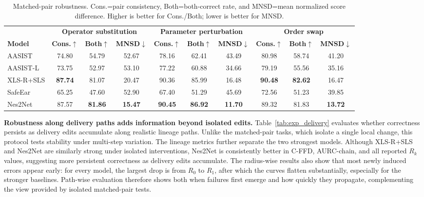 \begin{table}[t]
\centering
\scriptsize
\setlength{\tabcolsep}{3pt}
\renewcommand{\arraystretch}{1.03}
\caption{Matched-pair robustness. Cons.=pair consistency, Both=both-correct rate, and MNSD=mean normalized score difference. Higher is better for Cons./Both; lower is better for MNSD.}
\label{tab:exp_pair}
\vspace{-0.5em}
\begin{tabular}{@{}lccccccccc@{}}
\toprule
\textbf{} & \multicolumn{3}{c}{\textbf{Operator substitution}} & \multicolumn{3}{c}{\textbf{Parameter perturbation}} & \multicolumn{3}{c}{\textbf{Order swap}} \\
\cmidrule(lr){2-4} \cmidrule(lr){5-7} \cmidrule(lr){8-10}
\textbf{Model} & \textbf{Cons.}$\bm{\uparrow}$ & \textbf{Both}$\bm{\uparrow}$ & \textbf{MNSD}$\bm{\downarrow}$ & \textbf{Cons.}$\bm{\uparrow}$ & \textbf{Both}$\bm{\uparrow}$ & \textbf{MNSD}$\bm{\downarrow}$ & \textbf{Cons.}$\bm{\uparrow}$ & \textbf{Both}$\bm{\uparrow}$ & \textbf{MNSD}$\bm{\downarrow}$ \\
\midrule
AASIST     & 74.80 & 54.79 & 52.67 & 78.16 & 62.41 & 43.49 & 80.98 & 58.74 & 41.20 \\
AASIST-L   & 73.75 & 52.97 & 53.10 & 77.22 & 60.88 & 34.66 & 79.19 & 55.56 & 35.16 \\
XLS-R+SLS  & \textbf{87.74} & 81.07 & 20.47 & 90.36 & 85.99 & 16.48 & \textbf{90.48} & \textbf{82.62} & 16.47 \\
SafeEar    & 65.25 & 47.60 & 52.90 & 67.40 & 51.29 & 45.69 & 72.56 & 51.23 & 39.85 \\
Nes2Net    & 87.57 & \textbf{81.86} & \textbf{15.47} & \textbf{90.45} & \textbf{86.92} & \textbf{11.70} & 89.32 & 81.83 & \textbf{13.72} \\
\bottomrule
\end{tabular}
\end{table}

\noindent\textbf{Robustness along delivery paths adds information beyond isolated edits.}
Table~\ref{tab:exp_delivery} evaluates whether correctness persists as delivery edits accumulate along realistic lineage paths. Unlike the matched-pair tasks, which isolate a single local change, this protocol tests stability under multi-step variation. The lineage metrics further separate the two strongest models. Although XLS-R+SLS and Nes2Net are similarly strong under isolated interventions, Nes2Net is consistently better in C-FFD, AURC-chain, and all reported $R_k$ values, suggesting more persistent correctness as delivery edits accumulate. The radius-wise results also show that most newly induced errors appear early: for every model, the largest drop is from $R_0$ to $R_1$, after which the curves flatten substantially, especially for the stronger baselines. Path-wise evaluation therefore shows both when failures first emerge and how quickly they propagate, complementing the view provided by isolated matched-pair tests.

